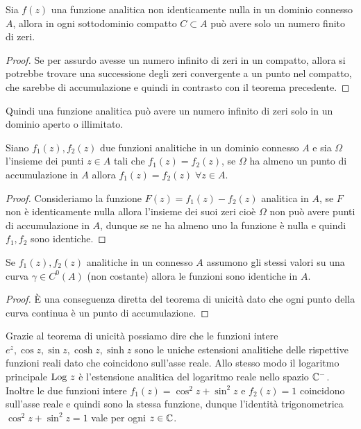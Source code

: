 \begin{corollary}
  Sia $ f(z) $ una funzione analitica non identicamente nulla in un dominio connesso $ A $, allora in ogni sottodominio compatto $ C \subset A $ può avere 
  solo un numero finito di zeri.
\end{corollary}

\begin{proof}
  Se per assurdo avesse un numero infinito di zeri in un compatto, allora si potrebbe trovare una successione degli zeri convergente a un punto nel 
  compatto, che sarebbe di accumulazione e quindi in contrasto con il teorema precedente.
\end{proof}

Quindi una funzione analitica può avere un numero infinito di zeri solo in un dominio aperto o illimitato.

\begin{theorem}[ di unicità ]
  Siano $ f_1(z), f_2(z) $ due funzioni analitiche in un dominio connesso $ A $ e sia $ \Omega $ l'insieme dei punti $ z \in A $ tali che 
  $ f_1(z) = f_2(z) $, se $ \Omega $ ha almeno un punto di accumulazione in $ A $ allora $ f_1(z) = f_2(z) \; \forall z \in A $.
\end{theorem}
\begin{proof}
  Consideriamo la funzione $ F(z) = f_1(z) - f_2(z) $ analitica in $ A $, se $ F $ non è identicamente nulla allora l'insieme dei suoi zeri cioè $ \Omega $ 
  non può avere punti di accumulazione in $ A $, dunque se ne ha almeno uno la funzione è nulla e quindi $ f_1,f_2 $ sono identiche.
\end{proof}

\begin{corollary}
  Se $ f_1(z), f_2(z) $ analitiche in un connesso $ A $ assumono gli stessi valori su una curva $ \gamma \in C^0(A) $ 
  (non costante) allora le funzioni sono identiche in $ A $.
\end{corollary}
\begin{proof}
  È una conseguenza diretta del teorema di unicità dato che ogni punto della curva continua è un punto di accumulazione.
\end{proof}

Grazie al teorema di unicità possiamo dire che le funzioni intere $ e^z, \cos z, \sin z, \cosh z, \sinh z $ sono le uniche estensioni analitiche delle 
rispettive funzioni reali dato che coincidono sull'asse reale. Allo stesso modo il logaritmo principale $ \textnormal{Log } z $ è l'estensione analitica del logaritmo 
reale nello spazio $ \mathbb{C}^- $. Inoltre le due funzioni intere $ f_1(z) = \cos^2 z + \sin^2 z $ e $ f_2(z) = 1 $ coincidono sull'asse reale e quindi sono la 
stessa funzione, dunque l'identità trigonometrica $ \cos^2 z + \sin^2 z = 1 $ vale per ogni $ z \in \mathbb{C} $.


